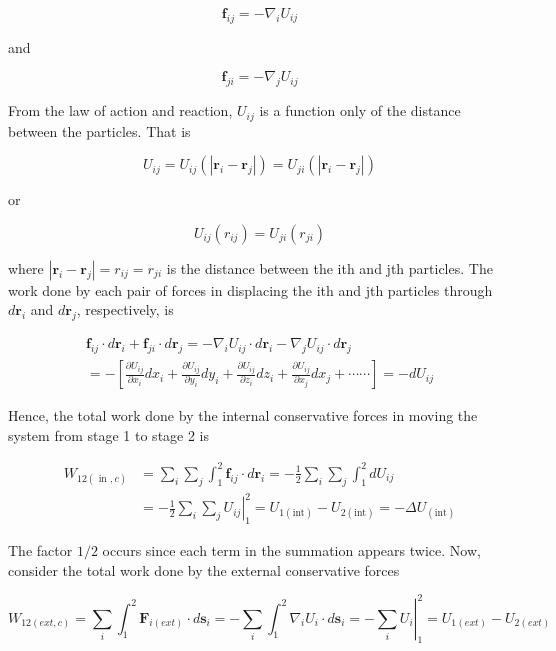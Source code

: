 \documentclass[10pt]{article}
\numberwithin{equation}{section}
\begin{document}
$$
\mathbf{f}_{i j}=-\nabla_{i} U_{i j}
$$

and

$$
\mathbf{f}_{j i}=-\nabla_{j} U_{i j}
$$

From the law of action and reaction, $U_{i j}$ is a function only of the distance between the particles. That is

$$
U_{i j}=U_{i j}\left(\left|\mathbf{r}_{i}-\mathbf{r}_{j}\right|\right)=U_{j i}\left(\left|\mathbf{r}_{i}-\mathbf{r}_{j}\right|\right)
$$

or

$$
U_{i j}\left(r_{i j}\right)=U_{j i}\left(r_{j i}\right)
$$

where $\left|\mathbf{r}_{i}-\mathbf{r}_{j}\right|=r_{i j}=r_{j i}$ is the distance between the ith and jth particles. The work done by each pair of forces in displacing the ith and jth particles through $d \mathbf{r}_{i}$ and $d \mathbf{r}_{j}$, respectively, is

$$
\begin{gathered}
\mathbf{f}_{i j} \cdot d \mathbf{r}_{i}+\mathbf{f}_{j i} \cdot d \mathbf{r}_{j}=-\nabla_{i} U_{i j} \cdot d \mathbf{r}_{i}-\nabla_{j} U_{i j} \cdot d \mathbf{r}_{j} \\
=-\left[\frac{\partial U_{i j}}{\partial x_{i}} d x_{i}+\frac{\partial U_{i j}}{\partial y_{i}} d y_{i}+\frac{\partial U_{i j}}{\partial z_{i}} d z_{i}+\frac{\partial U_{i j}}{\partial x_{j}} d x_{j}+\cdots \cdots\right]=-d U_{i j}
\end{gathered}
$$

Hence, the total work done by the internal conservative forces in moving the system from stage 1 to stage 2 is

$$
\begin{aligned}
W_{12(\text { in }, c)} & =\sum_{i} \sum_{j} \int_{1}^{2} \mathbf{f}_{i j} \cdot d \mathbf{r}_{i}=-\frac{1}{2} \sum_{i} \sum_{j} \int_{1}^{2} d U_{i j} \\
& =-\left.\frac{1}{2} \sum_{i} \sum_{j} U_{i j}\right|_{1} ^{2}=U_{1(\mathrm{int})}-U_{2(\mathrm{int})}=-\Delta U_{(\mathrm{int})}
\end{aligned}
$$

The factor $1 / 2$ occurs since each term in the summation appears twice. Now, consider the total work done by the external conservative forces

$$
W_{12(e x t, c)}=\sum_{i} \int_{1}^{2} \mathbf{F}_{i(e x t)} \cdot d \mathbf{s}_{i}=-\sum_{i} \int_{1}^{2} \nabla_{i} U_{i} \cdot d \mathbf{s}_{i}=-\left.\sum_{i} U_{i}\right|_{1} ^{2}=U_{1(e x t)}-U_{2(e x t)}
$$
\end{document}

